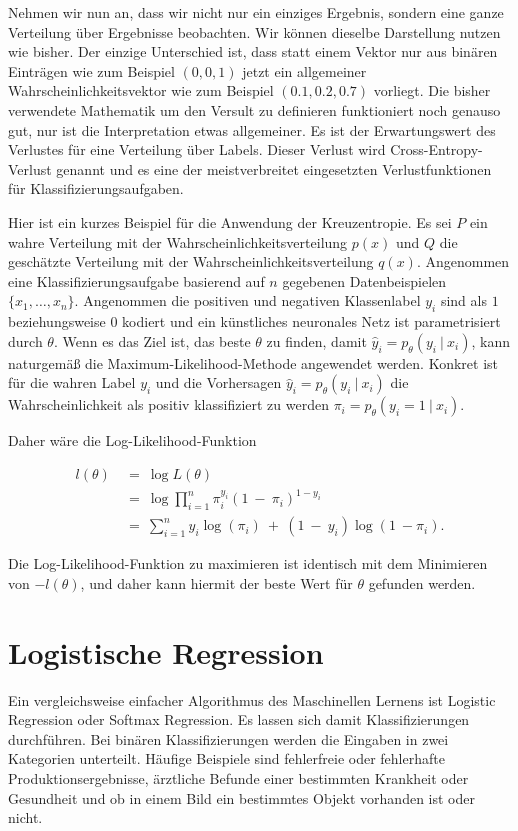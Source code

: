 Nehmen wir nun an, dass wir nicht nur ein einziges Ergebnis, sondern eine ganze Verteilung über Ergebnisse beobachten. Wir können dieselbe Darstellung nutzen wie bisher. Der einzige Unterschied ist, dass statt einem Vektor nur aus binären Einträgen wie zum Beispiel $(0, 0, 1)$ jetzt ein allgemeiner Wahrscheinlichkeitsvektor wie zum Beispiel $(0.1, 0.2, 0.7)$ vorliegt. Die bisher verwendete Mathematik um den Versult zu definieren funktioniert noch genauso gut, nur ist die Interpretation etwas allgemeiner. Es ist der Erwartungswert des Verlustes für eine Verteilung über Labels. Dieser Verlust wird Cross-Entropy-Verlust genannt und es eine der meistverbreitet eingesetzten Verlustfunktionen für Klassifizierungsaufgaben.
\cite{zhang2020dive}

Hier ist ein kurzes Beispiel für die Anwendung der Kreuzentropie. Es sei $P$ ein wahre Verteilung mit der Wahrscheinlichkeitsverteilung $p(x)$ und $Q$ die geschätzte Verteilung mit der Wahrscheinlichkeitsverteilung $q(x)$. Angenommen eine Klassifizierungsaufgabe basierend auf $n$ gegebenen Datenbeispielen $\{x_{1}, \dots, x_{n}\}$. Angenommen die positiven und negativen Klassenlabel $y_{i}$ sind als $1$ beziehungsweise $0$ kodiert und ein künstliches neuronales Netz ist parametrisiert durch $\theta$. Wenn es das Ziel ist, das beste $\theta$ zu finden, damit $\hat{y}_{i} = p_{\theta}(y_{i}\ |\ x_{i})$, kann naturgemäß die Maximum-Likelihood-Methode angewendet werden. Konkret ist für die wahren Label $y_{i}$ und die Vorhersagen $\hat{y}_{i} = p_{\theta}(y_{i}\ |\ x_{i})$ die Wahrscheinlichkeit als positiv klassifiziert zu werden $\pi_{i} = p_{\theta}(y_{i} = 1\ |\ x_{i})$.

\pagebreak
Daher wäre die Log-Likelihood-Funktion

\begin{align}
  l(\theta)\ &=\ \log L(\theta) \\
  &=\ \log\prod_{i=1}^{n}\pi_{i}^{y_{i}} (1\ -\ \pi_{i})^{1-y_{i}} \tag*{}\\
  &=\ \sum_{i=1}^{n}y_{i}\log(\pi_{i})\ +\ (1\ -\ y_{i})\log(1\ - \pi_{i}). \tag*{}
\end{align}

Die Log-Likelihood-Funktion zu maximieren ist identisch mit dem Minimieren von $-l(\theta)$, und daher kann hiermit der beste Wert für $\theta$ gefunden werden.
\cite{zhang2020dive}

\section{Logistische Regression}
\label{sec:logreg}
Ein vergleichsweise einfacher Algorithmus des Maschinellen Lernens ist Logistic Regression oder Softmax Regression. Es lassen sich damit Klassifizierungen durchführen. Bei binären Klassifizierungen werden die Eingaben in zwei Kategorien unterteilt. Häufige Beispiele sind fehlerfreie oder fehlerhafte Produktionsergebnisse, ärztliche Befunde einer bestimmten Krankheit oder Gesundheit und ob in einem Bild ein bestimmtes Objekt vorhanden ist oder nicht.

